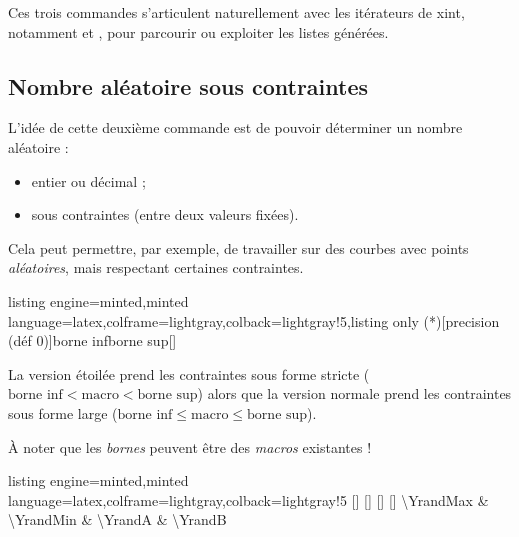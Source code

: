 \documentclass[11pt,a4paper]{ltxdoc}
\begin{document}
Ces trois commandes s'articulent naturellement avec les itérateurs de
\textsf{xint}, notamment  et
, pour parcourir ou exploiter les
listes générées.

\pagebreak

\subsection{Nombre aléatoire sous contraintes}\label{nbalea}

L'idée de cette deuxième commande est de pouvoir déterminer un nombre aléatoire :

\begin{itemize}
  \item entier ou décimal ;
  \item sous contraintes (entre deux valeurs fixées).
\end{itemize}

Cela peut permettre, par exemple, de travailler sur des courbes avec points \textit{aléatoires}, mais respectant certaines contraintes.

\begin{tcblisting}{listing engine=minted,minted language=latex,colframe=lightgray,colback=lightgray!5,listing only}
\ChoisirNbAlea(*)[precision (déf 0)]{borne inf}{borne sup}[\macro]
\end{tcblisting}

La version étoilée prend les contraintes sous forme stricte ($\text{borne inf} < \text{macro} < \text{borne sup}$) alors que la version normale prend les contraintes sous forme large ($\text{borne inf} \leqslant \text{macro} \leqslant \text{borne sup}$).

\smallskip

À noter que les \textit{bornes} peuvent être des \textit{macros} existantes !

\begin{tcblisting}{listing engine=minted,minted language=latex,colframe=lightgray,colback=lightgray!5}
[\YrandMax]%
[\YrandMin]%
[\YrandA]%
[\YrandB]%
\num{\YrandMax} \& \num{\YrandMin} \& \num{\YrandA} \& \num{\YrandB}
\end{tcblisting}
\end{document}
